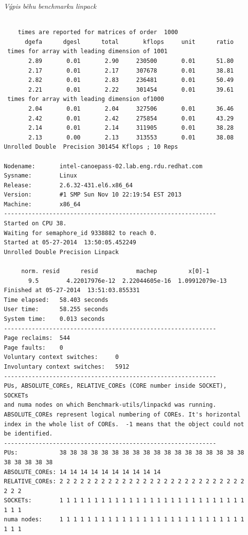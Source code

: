 \documentclass[
  field=ainfk,
  biblatex,
  glossaries,
  index
]{kidiplom}
\begin{document}
\newpage
\noindent
\textit{Výpis běhu benchmarku linpack} \\
\begingroup
\fontsize{10pt}{12pt}\selectfont
\begin{verbatim}

    times are reported for matrices of order  1000
      dgefa      dgesl      total       kflops     unit      ratio
 times for array with leading dimension of 1001
       2.89       0.01       2.90     230500       0.01      51.80
       2.17       0.01       2.17     307678       0.01      38.81
       2.82       0.01       2.83     236481       0.01      50.49
       2.21       0.01       2.22     301454       0.01      39.61
 times for array with leading dimension of1000
       2.04       0.01       2.04     327506       0.01      36.46
       2.42       0.01       2.42     275854       0.01      43.29
       2.14       0.01       2.14     311905       0.01      38.28
       2.13       0.00       2.13     313553       0.01      38.08
Unrolled Double  Precision 301454 Kflops ; 10 Reps 

Nodename:       intel-canoepass-02.lab.eng.rdu.redhat.com
Sysname:        Linux
Release:        2.6.32-431.el6.x86_64
Version:        #1 SMP Sun Nov 10 22:19:54 EST 2013
Machine:        x86_64
-------------------------------------------------------------
Started on CPU 38.
Waiting for semaphore_id 9338882 to reach 0.
Started at 05-27-2014  13:50:05.452249
Unrolled Double Precision Linpack

     norm. resid      resid           machep         x[0]-1     
       9.5        4.22017976e-12  2.22044605e-16  1.09912079e-13
Finished at 05-27-2014  13:51:03.855331
Time elapsed:   58.403 seconds
User time:      58.255 seconds
System time:    0.013 seconds
-------------------------------------------------------------
Page reclaims:  544
Page faults:    0
Voluntary context switches:     0
Involuntary context switches:   5912
-------------------------------------------------------------
PUs, ABSOLUTE_COREs, RELATIVE_COREs (CORE number inside SOCKET), SOCKETs 
and numa nodes on which Benchmark-utils/linpackd was running.
ABSOLUTE_COREs represent logical numbering of COREs. It's horizontal
index in the whole list of COREs.  -1 means that the object could not be identified.
-------------------------------------------------------------
PUs:            38 38 38 38 38 38 38 38 38 38 38 38 38 38 38 38 38 38 38 38 38 38 38
ABSOLUTE_COREs: 14 14 14 14 14 14 14 14 14 14 
RELATIVE_COREs: 2 2 2 2 2 2 2 2 2 2 2 2 2 2 2 2 2 2 2 2 2 2 2 2 2 2 2 2 2 2 
SOCKETs:        1 1 1 1 1 1 1 1 1 1 1 1 1 1 1 1 1 1 1 1 1 1 1 1 1 1 1 1 1 1 
numa nodes:     1 1 1 1 1 1 1 1 1 1 1 1 1 1 1 1 1 1 1 1 1 1 1 1 1 1 1 1 1 1 

\end{verbatim}
\endgroup
\end{document}
